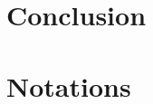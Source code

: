 \documentclass[a4paper,11pt]{report}
\begin{document}
	\chapter{Conclusion}
	
	
	\appendix
	
	\chapter*{Notations}
	
	\newpage

	\listoftables
	
	\listoffigures
	
	\printbibliography[heading=bibintoc]
\end{document}
